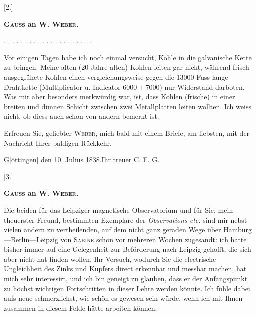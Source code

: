\clearpage\begingroup
{}

\begin{center}
[2.]\par\medskip
\textbf{\textsc{Gauss} an \textsc{W. Weber}.}
\end{center}
\noindent . . . . . . . . . . . . . . . . . . . . .\par
\noindent\hspace*{\parindent}Vor einigen Tagen habe ich noch einmal versucht, Kohle in die galvanische Kette zu bringen. Meine alten (20 Jahre alten) Kohlen leiten gar nicht, während frisch ausgeglühete Kohlen einen vergleichungsweise gegen die 13000 Fuss lange Drahtkette (Multiplicator u. Indicator $6000+7000$) nur  Widerstand darboten. Was mir aber besonders merkwürdig war, ist, dass  Kohlen (frische) in einer breiten und dünnen Schicht zwischen zwei Metallplatten  leiten wollten. Ich weiss nicht, ob diess auch schon von andern bemerkt ist.

Erfreuen Sie, geliebter \textsc{Weber}, mich bald mit einem Briefe, am liebsten, mit der Nachricht Ihrer baldigen Rückkehr.
\par\medskip
\noindent\hspace*{\parindent}G[öttingen] den 10. Julius 1838.\hfill Ihr treuer C. F. G.\hspace*{\parindent}
\begin{center}
[3.]\par\medskip
\textbf{\textsc{Gauss} an \textsc{W. Weber}.}
\end{center}
\noindent\hspace*{\parindent}Die beiden für das Leipziger magnetische Observatorium und für Sie, mein theuerster Freund, bestimmten Exemplare der \textit{Observations etc.} sind mir nebst vielen andern zu vertheilenden, auf dem nicht ganz geraden Wege über Hamburg—Berlin—Leipzig von \textsc{Sabine} schon vor mehreren Wochen zugesandt: ich hatte bisher immer auf eine Gelegenheit zur Beförderung nach Leipzig gehofft, die sich aber nicht hat finden wollen.
\clearpage{}
\noindent\hspace*{\parindent}Ihr Versuch, wodurch Sie die electrische Ungleichheit des Zinks und Kupfers direct erkennbar und messbar machen, hat mich sehr interessirt, und ich bin geneigt zu glauben, dass er der Anfangspunkt zu höchst wichtigen Fortschritten in dieser Lehre werden könnte. Ich fühle dabei aufs neue schmerzlichst, wie schön es gewesen sein würde, wenn ich mit Ihnen zusammen in diesem Felde hätte arbeiten können.

